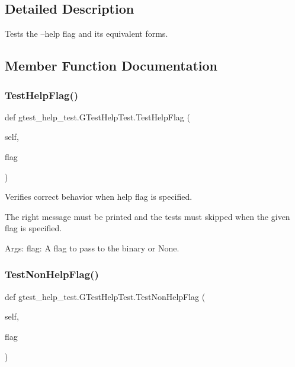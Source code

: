 \subsection{Detailed Description}
\begin{DoxyVerb}Tests the --help flag and its equivalent forms.\end{DoxyVerb}
 

\subsection{Member Function Documentation}
\mbox{\label{classgtest__help__test_1_1_g_test_help_test_a26cc1a64bd67278252ebfcd0ac0dca0c}} 
\subsubsection{\texorpdfstring{Test\+Help\+Flag()}{TestHelpFlag()}}
{\footnotesize\ttfamily def gtest\+\_\+help\+\_\+test.\+G\+Test\+Help\+Test.\+Test\+Help\+Flag (\begin{DoxyParamCaption}\item[{}]{self,  }\item[{}]{flag }\end{DoxyParamCaption})}

\begin{DoxyVerb}Verifies correct behavior when help flag is specified.

The right message must be printed and the tests must
skipped when the given flag is specified.

Args:
  flag:  A flag to pass to the binary or None.
\end{DoxyVerb}
 \mbox{\label{classgtest__help__test_1_1_g_test_help_test_a03ffa91ecf6193ed2ed80b53933112ab}} 
\subsubsection{\texorpdfstring{Test\+Non\+Help\+Flag()}{TestNonHelpFlag()}}
{\footnotesize\ttfamily def gtest\+\_\+help\+\_\+test.\+G\+Test\+Help\+Test.\+Test\+Non\+Help\+Flag (\begin{DoxyParamCaption}\item[{}]{self,  }\item[{}]{flag }\end{DoxyParamCaption})}

